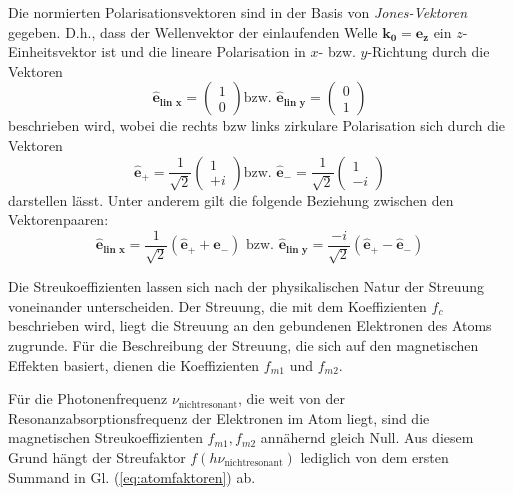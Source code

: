\noindent
Die normierten Polarisationsvektoren sind in der Basis von \emph{Jones-Vektoren} gegeben. D.h., dass der Wellenvektor der einlaufenden Welle $\mathbf{k_0} = \mathbf{e_{z}}$ ein $z$-Einheitsvektor ist und die lineare Polarisation in $x$- bzw. $y$-Richtung durch die Vektoren
\begin{equation}
    \mathbf{\hat{e}_{\text{lin $x$}}} = \begin{pmatrix}
    1\\
    0
    \end{pmatrix}
    \text{bzw. }
    \mathbf{\hat{e}_{\text{lin $y$}}} = \begin{pmatrix}
    0\\
    1
    \end{pmatrix}
    \label{eq:lin_jones}
\end{equation}
beschrieben wird, wobei die rechts bzw links zirkulare Polarisation sich durch die Vektoren 
\begin{equation}
    \mathbf{\hat{e}_+} = \frac{1}{\sqrt{2}}\begin{pmatrix}
    1\\
    +i
    \end{pmatrix}
    \text{bzw. }
    \mathbf{\hat{e}_-} = \frac{1}{\sqrt{2}}\begin{pmatrix}
    1\\
    -i
    \end{pmatrix}
    \label{eq:circ_jones}
\end{equation}
darstellen lässt. Unter anderem gilt die folgende Beziehung zwischen den Vektorenpaaren:
\begin{equation}
    \mathbf{\hat{e}_{\text{lin $x$}}} = \frac{1}{\sqrt{2}}(\mathbf{\hat{e}_+} + \mathbf{\hat{e}_-}) \text{ bzw. } \mathbf{\hat{e}_{\text{lin $y$}}} = \frac{-i}{\sqrt{2}}(\mathbf{\hat{e}_+} - \mathbf{\hat{e}_-})
    \label{eq:lin_circ_jones}
\end{equation}

\noindent
Die Streukoeffizienten lassen sich nach der physikalischen Natur der Streuung voneinander unterscheiden. Der Streuung, die mit dem Koeffizienten $f_c$ beschrieben wird, liegt die Streuung an den gebundenen Elektronen des Atoms zugrunde. Für die Beschreibung der Streuung, die sich auf den magnetischen Effekten basiert, dienen die Koeffizienten $f_{m1}$ und $f_{m2}$.


\noindent
Für die Photonenfrequenz $\nu_{\text{nichtresonant}}$, die weit von der Resonanzabsorptionsfrequenz der Elektronen im Atom liegt, sind die magnetischen Streukoeffizienten  $f_{m1}, f_{m2}$ annähernd gleich Null. Aus diesem Grund hängt der Streufaktor $f(h\nu_{\text{nichtresonant}})$ lediglich von dem ersten Summand in Gl. (\ref{eq:atomfaktoren}) ab.
%     

